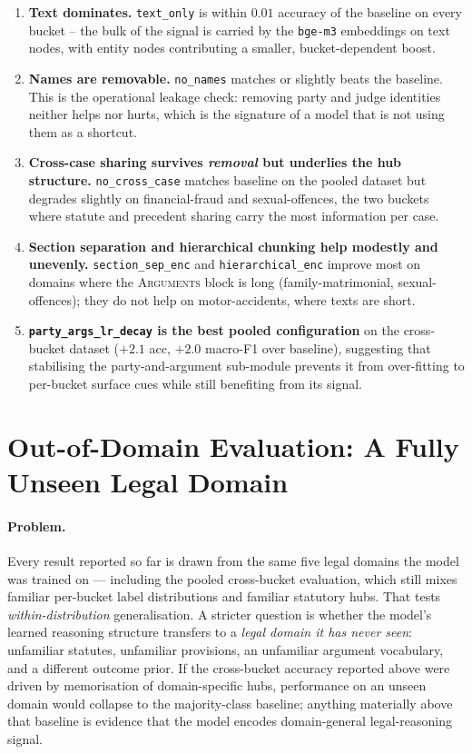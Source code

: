 \begin{enumerate}
  \item \textbf{Text dominates.} \texttt{text\_only} is within
    $0.01$ accuracy of the baseline on every bucket -- the bulk of
    the signal is carried by the \texttt{bge-m3} embeddings on text
    nodes, with entity nodes contributing a smaller,
    bucket-dependent boost.
  \item \textbf{Names are removable.} \texttt{no\_names} matches or
    slightly beats the baseline. This is the operational leakage
    check: removing party and judge identities neither helps nor
    hurts, which is the signature of a model that is not using them
    as a shortcut.
  \item \textbf{Cross-case sharing survives \emph{removal} but
    underlies the hub structure.} \texttt{no\_cross\_case} matches
    baseline on the pooled dataset but degrades slightly on
    financial-fraud and sexual-offences, the two buckets where
    statute and precedent sharing carry the most information per case.
  \item \textbf{Section separation and hierarchical chunking help
    modestly and unevenly.}
    \texttt{section\_sep\_enc} and \texttt{hierarchical\_enc} improve
    most on domains where the \textsc{Arguments} block is long
    (family-matrimonial, sexual-offences); they do not help on
    motor-accidents, where texts are short.
  \item \textbf{\texttt{party\_args\_lr\_decay} is the best
    pooled configuration} on the cross-bucket dataset
    ($+2.1$ acc, $+2.0$ macro-F1 over baseline), suggesting that
    stabilising the party-and-argument sub-module prevents it from
    over-fitting to per-bucket surface cues while still benefiting from
    its signal.
\end{enumerate}

\section{Out-of-Domain Evaluation: A Fully Unseen Legal Domain}
\label{sec:cross_domain_food_safety}

\paragraph{Problem.}
Every result reported so far is drawn from the same five legal
domains the model was trained on --- including the pooled
cross-bucket evaluation, which still mixes familiar per-bucket label
distributions and familiar statutory hubs.  That tests
\emph{within-distribution} generalisation.  A stricter question is
whether the model's learned reasoning structure transfers to a
\emph{legal domain it has never seen}: unfamiliar statutes,
unfamiliar provisions, an unfamiliar argument vocabulary, and a
different outcome prior.  If the cross-bucket accuracy reported above
were driven by memorisation of domain-specific hubs, performance on
an unseen domain would collapse to the majority-class baseline;
anything materially above that baseline is evidence that the model
encodes domain-general legal-reasoning signal.

